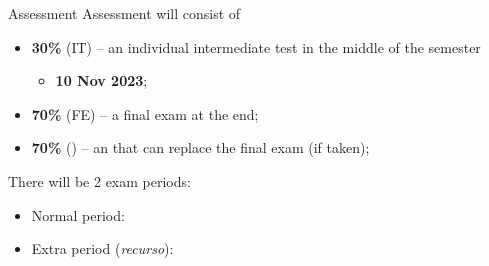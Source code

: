 \documentclass[aspectratio=169]{beamer}
\begin{document}
\begin{frame}{Assessment}
  Assessment will consist of
  \begin{itemize}
  \item \textbf{30\%} (\alert{IT}) -- an individual \alert{intermediate test} in the middle of the semester
  \begin{itemize}
    \item \textbf{10 Nov 2023};
  \end{itemize}
  \item \textbf{70\%} (\alert{FE}) -- a \alert{final exam} at the end;
  \item \textbf{70\%} () -- an  that can replace the final exam (if taken);
  \end{itemize}

  There will be 2 exam periods:
  \begin{itemize}
    \item Normal period:
    \item Extra period (\emph{recurso}): 
  \end{itemize}
\end{frame}

\end{document}
